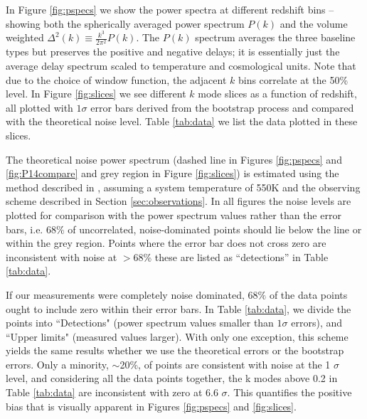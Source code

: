 \documentclass[preprint2]{aastex}
\begin{document}
In  Figure \ref{fig:pspecs} we show the  power spectra at different redshift bins --showing both the spherically averaged power spectrum $P(k)$ and the volume weighted  $\Delta^2(k)\equiv\frac{k^3}{2\pi^2}P(k)$.  The $P(k)$ spectrum averages the three baseline types but preserves the positive and negative delays; it is essentially just the average delay spectrum scaled to temperature and cosmological units. Note that due to the choice of window function, the adjacent $k$ bins correlate at the  50\% level. In Figure \ref{fig:slices} we see different $k$ mode slices as a function of redshift,  all plotted with $1\sigma$ error bars derived from the bootstrap process and compared with the theoretical noise level. Table \ref{tab:data} we list the data plotted in these slices.   

The theoretical noise power spectrum (dashed line in Figures \ref{fig:pspecs} and \ref{fig:P14compare} and grey region in Figure \ref{fig:slices}) is estimated using the method described in \cite{Pober:2013p9581}, assuming a system temperature of 550K and the observing scheme described in Section \ref{sec:observations}. In all figures the noise levels are plotted for comparison with the power spectrum values rather than the error bars, i.e. 68\% of uncorrelated, noise-dominated points should lie below the line or within the grey region.    Points where the error bar does not cross zero are inconsistent with noise at $>68$\% these are listed as ``detections'' in Table \ref{tab:data}.   

If our measurements were completely noise dominated, $68\%$ of the data points ought to include zero within their error bars.  In Table \ref{tab:data}, we divide the points into ``Detections" (power spectrum values smaller than $1\sigma$ errors), and ``Upper limits" (measured values larger).  With only one exception, this scheme yields the same results whether we use the theoretical errors or the bootstrap errors.  Only a minority, $\sim$20\%, of points are consistent with noise at the 1 $\sigma$ level, and considering all the data points together, the k modes above 0.2 in Table \ref{tab:data} are inconsistent with zero at 6.6 $\sigma$.  This quantifies the positive bias that is visually apparent in Figures \ref{fig:pspecs} and \ref{fig:slices}.

\end{document}
